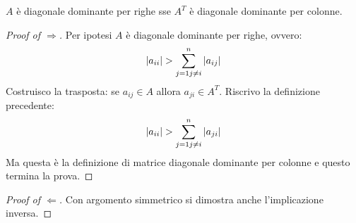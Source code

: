 \begin{exercise}[3.9, Lemma 3.5]
$A$ \`e diagonale dominante per righe sse $A^{T}$ \`e diagonale dominante per
colonne.
\end{exercise}
\begin{proof}[Proof of $\Rightarrow$]
Per ipotesi $A$ \`e diagonale dominante per righe, ovvero:
\begin{displaymath}
|a_{ii}| > \sum_{j = 1 \\j \not = i}^{n}{|a_{ij}|}
\end{displaymath}
Costruisco la trasposta: se $a_{ij} \in A$ allora $a_{ji} \in A^{T}$. Riscrivo
la definizione precedente:
\begin{displaymath}
|a_{ii}| > \sum_{j = 1 \\j \not = i}^{n}{|a_{ji}|}
\end{displaymath}
Ma questa \`e la definizione di matrice diagonale dominante per colonne e questo
termina la prova.
\end{proof}

\begin{proof}[Proof of $\Leftarrow$]
Con argomento simmetrico si dimostra anche l'implicazione inversa.
\end{proof}

